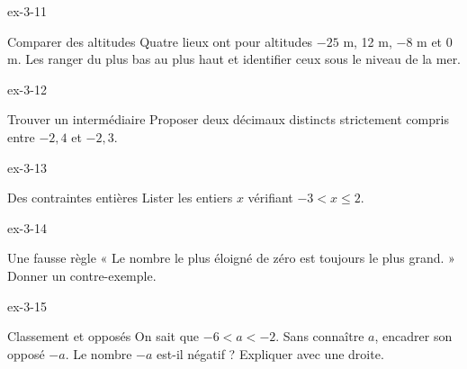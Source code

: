 \begin{blocLivre}{ex-3-11}\begin{exercice}[3]{Comparer des altitudes}
Quatre lieux ont pour altitudes $-25$ m, 12 m, $-8$ m et 0 m. Les ranger du plus bas au plus haut et identifier ceux sous le niveau de la mer.
\end{exercice}\end{blocLivre}
\begin{blocLivre}{ex-3-12}\begin{exercice}[3]{Trouver un intermédiaire}
Proposer deux décimaux distincts strictement compris entre $-2{,}4$ et $-2{,}3$.
\end{exercice}\end{blocLivre}
\begin{blocLivre}{ex-3-13}\begin{exercice}[3]{Des contraintes entières}
Lister les entiers $x$ vérifiant $-3<x\le2$.
\end{exercice}\end{blocLivre}
\begin{blocLivre}{ex-3-14}\begin{exercice}[3]{Une fausse règle}
« Le nombre le plus éloigné de zéro est toujours le plus grand. » Donner un contre-exemple.
\end{exercice}\end{blocLivre}
\begin{blocLivre}{ex-3-15}\begin{exercice}[3]{Classement et opposés}
On sait que $-6<a<-2$. Sans connaître $a$, encadrer son opposé $-a$. Le nombre $-a$ est-il négatif ? Expliquer avec une droite.
\label{fig-ex-3-15}
\end{exercice}\end{blocLivre}

\clearpage
